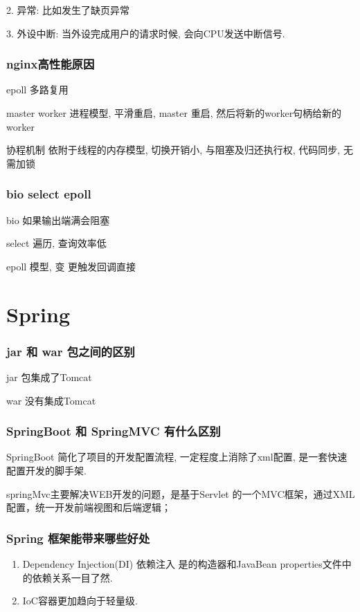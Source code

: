 \documentclass[UTF8]{ctexart}
\begin{document}
2. 异常: 比如发生了缺页异常

3. 外设中断: 当外设完成用户的请求时候, 会向CPU发送中断信号.

\subsubsection{nginx高性能原因}
epoll 多路复用

master worker 进程模型, 平滑重启, master 重启, 然后将新的worker句柄给新的worker

协程机制 依附于线程的内存模型, 切换开销小, 与阻塞及归还执行权, 代码同步, 无需加锁

\subsubsection{bio select epoll}
bio 如果输出端满会阻塞

select  遍历, 查询效率低

epoll 模型, 变 更触发回调直接

\section{Spring}
\subsubsection{jar 和 war 包之间的区别}
jar 包集成了Tomcat

war 没有集成Tomcat
\subsubsection{SpringBoot 和 SpringMVC 有什么区别}
SpringBoot 简化了项目的开发配置流程, 一定程度上消除了xml配置, 是一套快速配置开发的脚手架.

springMvc主要解决WEB开发的问题，是基于Servlet 的一个MVC框架，通过XML配置，统一开发前端视图和后端逻辑；

\subsubsection{Spring 框架能带来哪些好处}

\begin{enumerate}
	\item Dependency Injection(DI) 依赖注入 是的构造器和JavaBean properties文件中的依赖关系一目了然.
	\item IoC容器更加趋向于轻量级.
\end{enumerate}
\end{document}
